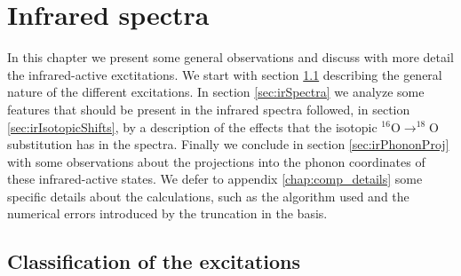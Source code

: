 \chapter{Infrared spectra}
\label{chap:irSpectra}

In this chapter we present some general observations and discuss with more detail the infrared-active exctitations.
We start with section \ref{sec:classification} describing the general nature of the different excitations. 
In section \ref{sec:irSpectra} we analyze some features that should be present in the infrared spectra followed, in section \ref{sec:irIsotopicShifts}, by a description of the effects that the isotopic $^{16}$O$\rightarrow ^{18}$O substitution has in the spectra. 
Finally we conclude in section \ref{sec:irPhononProj} with some observations about the projections into the phonon coordinates of these infrared-active states.
We defer to appendix \ref{chap:comp_details} some specific details about the calculations, such as the algorithm used and the numerical errors introduced by the truncation in the basis.

\section{Classification of the excitations}
\label{sec:classification}

